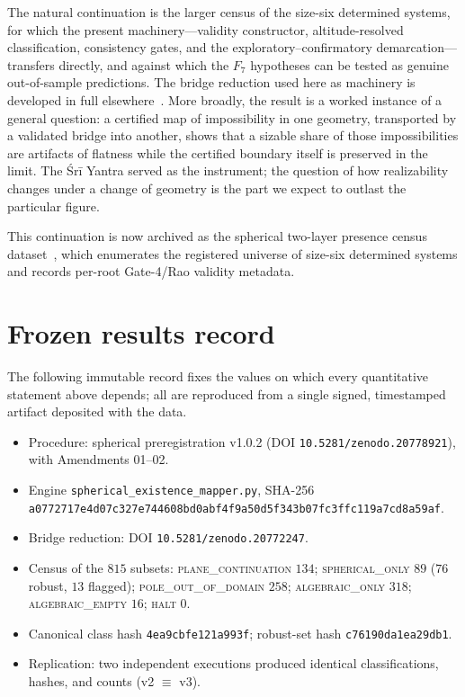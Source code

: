 \documentclass[11pt]{article}
\begin{document}
The natural continuation is the larger census of the size-six determined systems, for which the present machinery---validity constructor, altitude-resolved classification, consistency gates, and the exploratory--confirmatory demarcation---transfers directly, and against which the $F_7$ hypotheses can be tested as genuine out-of-sample predictions. The bridge reduction used here as machinery is developed in full elsewhere~\cite{bridge}. More broadly, the result is a worked instance of a general question: a certified map of impossibility in one geometry, transported by a validated bridge into another, shows that a sizable share of those impossibilities are artifacts of flatness while the certified boundary itself is preserved in the limit. The Śrī Yantra served as the instrument; the question of how realizability changes under a change of geometry is the part we expect to outlast the particular figure.

This continuation is now archived as the spherical two-layer presence census dataset~\cite{sphericaldataset}, which enumerates the registered universe of size-six determined systems and records per-root Gate-4/Rao validity metadata.

\appendix
\section{Frozen results record}
\label{app:frozen}
The following immutable record fixes the values on which every quantitative
statement above depends; all are reproduced from a single signed, timestamped
artifact deposited with the data.

\begin{itemize}
\itemsep2pt
\item Procedure: spherical preregistration v1.0.2 (DOI \texttt{10.5281/zenodo.20778921}), with Amendments 01--02.
\item Engine \texttt{spherical\_existence\_mapper.py}, SHA-256\\
\texttt{a0772717e4d07c327e744608bd0abf4f9a50d5f343b07fc3ffc119a7cd8a59af}.
\item Bridge reduction: DOI \texttt{10.5281/zenodo.20772247}.
\item Census of the $815$ subsets:
  \textsc{plane\_continuation} $134$;
  \textsc{spherical\_only} $89$ ($76$ robust, $13$ flagged);
  \textsc{pole\_out\_of\_domain} $258$;
  \textsc{algebraic\_only} $318$;
  \textsc{algebraic\_empty} $16$;
  \textsc{halt} $0$.
\item Canonical class hash \texttt{4ea9cbfe121a993f}; robust-set hash \texttt{c76190da1ea29db1}.
\item Replication: two independent executions produced identical classifications, hashes, and counts (v2 $\equiv$ v3).
\end{itemize}
\end{document}
